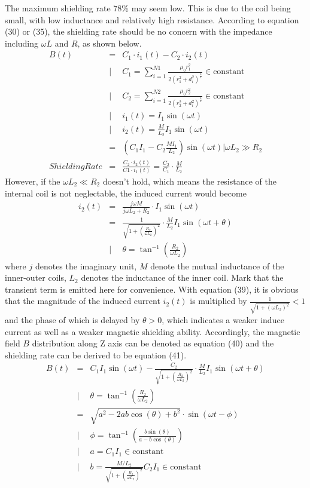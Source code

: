 The maximum shielding rate 78\% may seem low.
This is due to the coil being small, with low inductance and relatively high resistance.
According to equation (30) or (35), the shielding rate should be no concern with the impedance including $\omega L$ and $R$,
as shown below.
\begin{eqnarray}
  B(t) &=& C_1\cdot i_1(t) - C_2\cdot i_2(t)\nonumber\\
  &|& C_1 = \sum_{i=1}^{N1} \frac{\mu_0r_1^2}{2\left(r_1^2 + d_i^2\right)^{\frac{3}{2}}} \in \mathrm{constant}\nonumber\\
  &|& C_2 = \sum_{i=1}^{N2} \frac{\mu_0r_2^2}{2\left(r_2^2 + d_i^2\right)^{\frac{3}{2}}} \in \mathrm{constant}\nonumber\\
  &|& i_1(t) = I_1\sin(\omega t)\nonumber\\
  &|& i_2(t) = \frac{M}{L_2}I_1\sin(\omega t)\nonumber\\
  &=& \left(C_1I_1 - C_2\frac{MI_1}{L_2}\right)\sin(\omega t)|\omega L_2 \gg R_2\\
  Shielding Rate &=& \frac{C_2\cdot i_2(t)}{C1\cdot i_1(t)} = \frac{C_2}{C_1}\cdot\frac{M}{L_2}
\end{eqnarray}
However, if the $\omega L_2 \ll R_2$ doesn't hold, which means the resistance of the internal coil is not neglectable,
the induced current would become
\begin{eqnarray}
  i_2(t) &=& \frac{j\omega M}{j\omega L_2 + R_2}\cdot I_1\sin(\omega t)\nonumber\\
  &=& \frac{1}{\sqrt{1+\left(\frac{R_2}{\omega L_2}\right)^2}}\cdot \frac{M}{L_2}I_1\sin(\omega t + \theta)\\
  &|& \theta = \tan^{-1}(\frac{R_2}{\omega L_2})\nonumber
\end{eqnarray}
where $j$ denotes the imaginary unit, $M$ denote the mutual inductance of the inner-outer coils,
$L_2$ denotes the inductance of the inner coil.
Mark that the transient term is emitted here for convenience.
With equation (39), it is obvious that the magnitude of the induced current $i_2(t)$ is multiplied by
$\frac{1}{\sqrt{1+(\omega L_2)^2}} < 1$ and the phase of which is delayed by $\theta > 0$,
which indicates a weaker induce current as well as a weaker magnetic shielding ability.
Accordingly, the magnetic field $B$ distribution along Z axis can be denoted as equation (40) and the shielding rate can be derived to be equation (41).
\begin{eqnarray}
  B(t) &=& C_1I_1\sin(\omega t) - \frac{C_2}{\sqrt{1+\left(\frac{R_2}{\omega L_2}\right)^2}}\cdot \frac{M}{L_2}I_1\sin(\omega t + \theta)\nonumber\\
  &|& \theta = \tan^{-1}(\frac{R_2}{\omega L_2})\nonumber\\
  &=& \sqrt{a^2 - 2ab\cos(\theta) + b^2}\cdot\sin(\omega t - \phi)\\
  &|& \phi = \tan^{-1}\left(\frac{b\sin(\theta)}{a-b\cos(\theta)}\right)\nonumber\\
  &|& a = C_1I_1 \in \mathrm{constant}\nonumber\\
  &|& b = \frac{M/L_2}{\sqrt{1+\left(\frac{R_2}{\omega L_2}\right)^2}}C_2I_1 \in \mathrm{constant}\nonumber
\end{eqnarray}
